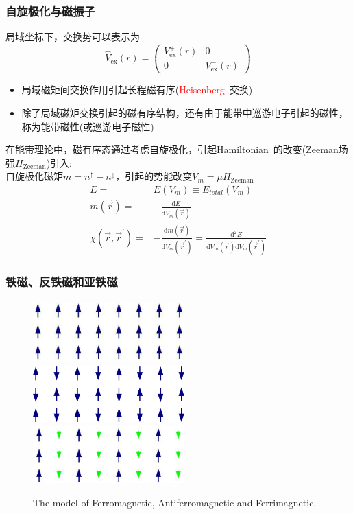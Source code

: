 \frame
{
	\frametitle{自旋极化与磁振子}
			局域坐标下，交换势可以表示为
			\begin{displaymath}
				\hat{V}_{\mathrm{ex}}(r)=\left(
				\begin{matrix}
					V_{\mathrm{ex}}^+(r) &0\\
					0 &V_{\mathrm{ex}}^-(r)
				\end{matrix}\right)
			\end{displaymath}
	\begin{itemize}
		\item 局域磁矩间交换作用引起长程磁有序(\textcolor{red}{\textrm{Heisenberg~}}交换)
		\item 除了局域磁矩交换引起的磁有序结构，还有由于能带中巡游电子引起的磁性，称为能带磁性(或巡游电子磁性)
	\end{itemize}
	在能带理论中，磁有序态通过考虑自旋极化，引起\textrm{Hamiltonian~}的改变(\textrm{Zeeman}场强$H_{\mathrm{Zeeman}}$)引入:\\
	自旋极化磁矩$m=n^{\uparrow}-n^{\downarrow}$，引起的势能改变$V_m=\mu H_{\mathrm{Zeeman}}$
	\begin{displaymath}
		\begin{aligned}
			E=&E(V_m)\equiv E_{total}(V_m)\\
			m(\vec r)=&-\frac{\mathrm{d}E}{\mathrm{d}V_m(\vec r)}\\
			\chi(\vec r,\vec r^{\prime})=&-\frac{\mathrm{d}m(\vec r)}{\mathrm{d}V_m(\vec r^{\prime})}=\frac{\mathrm{d}^2E}{\mathrm{d}V_m(\vec r)\mathrm{d}V_m(\vec r^{\prime})}
		\end{aligned}
	\end{displaymath}
}

\frame
{
	\frametitle{铁磁、反铁磁和亚铁磁}
\begin{figure}[h!]
	\vspace{-0.20in}
\centering
\includegraphics[height=0.95in,width=2.3in,viewport=0 0 350 230,clip]{Figures/Ferromagnetic.jpeg}\\
\includegraphics[height=0.85in,width=2.3in,viewport=0 -13 350 155,clip]{Figures/Antiferromagnetic.png}\\
\includegraphics[height=0.88in,width=2.3in,viewport=0 0 350 225,clip]{Figures/Ferrimagnetic.jpeg}
\caption{\tiny \textrm{The model of Ferromagnetic, Antiferromagnetic and Ferrimagnetic.}}%
\label{Ferrimagneitic_Model}
\end{figure} 
}


